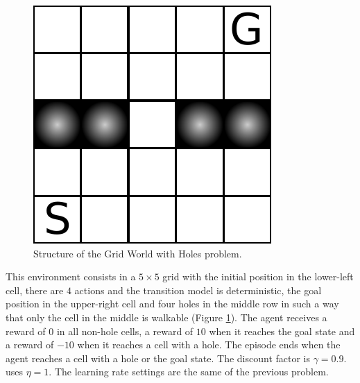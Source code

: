 \documentclass[conference]{IEEEtran}
\begin{document}
\begin{figure}[t]
\centering
\includegraphics[scale=.55]{./imgs/gridHole/gridhole.pdf}
\caption{Structure of the Grid World with Holes problem.}
  \label{F:grid_hole_map}
\end{figure}
This environment consists in a $5 \times 5$ grid with the initial position in the lower-left cell, there are $4$ actions and the transition model is deterministic, the goal position in the upper-right cell and four holes in the middle row in such a way that only the cell in the middle is walkable (Figure \ref{F:grid_hole_map}). The agent receives a reward of $0$ in all non-hole cells, a reward of $10$ when it reaches the goal state and a reward of $-10$ when it reaches a cell with a hole. The episode ends when the agent reaches a cell with a hole or the goal state. The discount factor is $\gamma = 0.9$. \alg uses $\eta = 1$.
The learning rate settings are the same of the previous problem.
\end{document}
